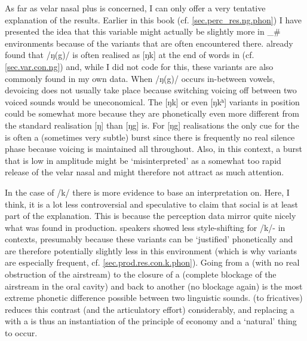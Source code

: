 As far as velar nasal plus is concerned, I can only offer a very tentative explanation of the results.
Earlier in this book (cf. \ref{sec.perc_res.ng.phon}) I have presented the idea that this variable might actually be slightly more  in \_\# environments because of the variants that are often encountered there.
\textcite{knowles1973} already found that /ŋ(g)/ is often realised as [ŋk] at the end of words in  (cf. \ref{sec.var.con.ng}) and, while I did not code for this, these variants are also commonly found in my own data.
When /ŋ(g)/ occurs in-between vowels, devoicing does not usually take place because switching voicing off between two voiced sounds would be uneconomical.
The [ŋk] or even [ŋkʰ] variants in  position could be somewhat more  because they are phonetically even more different from the standard realisation [ŋ] than [ŋg] is.
For  [ŋg] realisations the only cue for the  is often a (sometimes very subtle) burst since there is frequently no real silence phase because voicing is maintained all throughout.
Also, in this context, a burst that is low in amplitude might be `misinterpreted' as a somewhat too rapid release of the velar nasal and might therefore not attract as much attention.

In the case of /k/  there is more evidence to base an interpretation on.
Here, I think, it is a lot less controversial and speculative to claim that social  is at least part of the explanation.
This is because the perception data mirror quite nicely what was found in production.
 speakers showed less style-shifting for /k/- in  contexts, presumably because these variants can be `justified' phonetically and are therefore potentially slightly less  in this environment (which is why  variants are especially frequent, cf. \ref{sec.prod.res.con.k.phon}).
Going from a  (with no real obstruction of the airstream) to the closure of a  (complete blockage of the airstream in the oral cavity) and back to another  (no blockage again) is the most extreme phonetic difference possible between two linguistic sounds.
 (to fricatives) reduces this contrast (and the articulatory effort) considerably, and replacing a  with a  is thus an instantiation of the principle of economy and a `natural' thing to occur.

